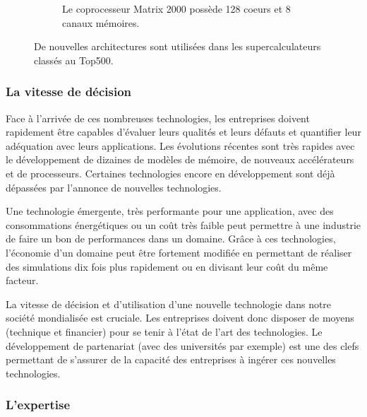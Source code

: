 \begin{figure}[t!]
\begin{subfigure}[t]{0.48\textwidth}
                \caption{\label{fig:edlp_matrix_2000}Le coprocesseur Matrix 2000 possède 128 coeurs et 8 canaux mémoires.}
            \end{subfigure}
            \caption{\label{fig:new_proc} De nouvelles architectures sont utilisées dans les supercalculateurs classés au Top500.}
        \end{figure}

           
    \subsubsection{La vitesse de décision}\label{sec:edl_chal_vitesse}
        
        Face à l'arrivée de ces nombreuses technologies, les entreprises doivent rapidement être capables d'évaluer leurs qualités et leurs défauts et quantifier leur adéquation avec leurs applications. Les évolutions récentes sont très rapides avec le développement de dizaines de modèles de mémoire, de nouveaux accélérateurs et de processeurs. Certaines technologies encore en développement sont déjà dépassées par l’annonce de nouvelles technologies.
        
        Une technologie émergente, très performante pour une application, avec des consommations énergétiques ou un coût très faible peut permettre à une industrie de faire un bon de performances dans un domaine. Grâce à ces technologies, l'économie d'un domaine peut être fortement modifiée en permettant de réaliser des simulations dix fois plus rapidement ou en divisant leur coût du même facteur.
                
        La vitesse de décision et d'utilisation d'une nouvelle technologie dans notre société mondialisée est cruciale. Les entreprises doivent donc disposer de moyens (technique et financier) pour se tenir à l'état de l'art des technologies. Le développement de partenariat (avec des universités par exemple) est une des clefs permettant de s’assurer de la capacité des entreprises à ingérer ces nouvelles technologies.

    \subsubsection{L'expertise}\label{sec:edl_chal_expertise}

